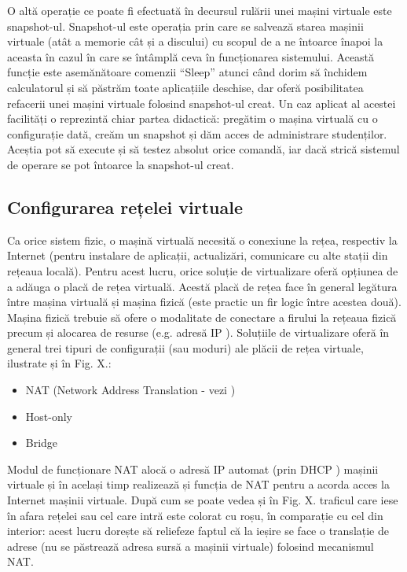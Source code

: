 O altă operație ce poate fi efectuată în decursul rulării unei mașini virtuale
este snapshot-ul. Snapshot-ul este operația prin care se salvează starea mașinii
virtuale (atât a memorie cât și a discului) cu scopul de a ne întoarce înapoi la
aceasta în cazul în care se întâmplă ceva în funcționarea sistemului. Această
funcție este asemănătoare comenzii “Sleep” atunci când dorim să închidem
calculatorul și să păstrăm toate aplicațiile deschise, dar oferă posibilitatea
refacerii unei mașini virtuale folosind snapshot-ul creat. Un caz aplicat al
acestei facilități o reprezintă chiar partea didactică: pregătim o mașina
virtuală cu o configurație dată, creăm un snapshot și dăm acces de administrare
studenților. Aceștia pot să execute și să testez absolut orice comandă, iar dacă
strică sistemul de operare se pot întoarce la snapshot-ul creat.

\subsection{Configurarea rețelei virtuale}
\label{sec:vm-ops-config}

Ca orice sistem fizic, o mașină virtuală necesită o conexiune la rețea,
respectiv la Internet (pentru instalare de aplicații, actualizări, comunicare cu
alte stații din rețeaua locală). Pentru acest lucru, orice soluție de
virtualizare oferă opțiunea de a adăuga o placă de rețea virtuală. Acestă placă
de rețea face în general legătura între mașina virtuală și mașina fizică (este
practic un fir logic între acestea două). Mașina fizică trebuie să ofere o
modalitate de conectare a firului la rețeaua fizică precum și alocarea de
resurse (e.g. adresă IP ). Soluțiile de
virtualizare oferă în general trei tipuri de configurații (sau moduri) ale
plăcii de rețea virtuale, ilustrate și în Fig. X.:

\begin{itemize}
	\item NAT  (Network Address
		Translation - vezi )
	\item Host-only
	\item Bridge
\end{itemize}

Modul de funcționare NAT alocă o adresă IP automat (prin DHCP
) mașinii virtuale și în
același timp realizează și funcția de NAT pentru a acorda acces la Internet
mașinii virtuale. După cum se poate vedea și în Fig. X. traficul care iese în
afara rețelei sau cel care intră este colorat cu roșu, în comparație cu cel din
interior: acest lucru dorește să reliefeze faptul că la ieșire se face o
translație de adrese (nu se păstrează adresa sursă a mașinii virtuale) folosind
mecanismul NAT.

